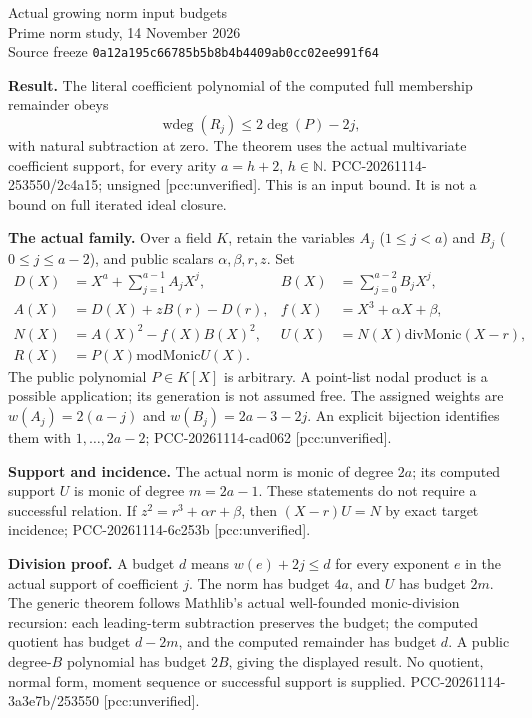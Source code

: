 \documentclass[10pt]{article}
\begin{document}
\begin{center}
{\Large Actual growing norm input budgets}\\[4pt]
Prime norm study, 14 November 2026\\
Source freeze \texttt{0a12a195c66785b5b8b4b4409ab0cc02ee991f64}
\end{center}

\textbf{Result.} The literal coefficient polynomial of the computed full
membership remainder obeys
\[
 \operatorname{wdeg}(R_j)\le 2\deg(P)-2j,
\]
with natural subtraction at zero. The theorem uses the actual multivariate
coefficient support, for every arity $a=h+2$, $h\in\mathbb N$.
PCC-20261114-253550/2c4a15; unsigned [pcc:unverified].
This is an input bound. It is not a bound on full iterated ideal closure.

\textbf{The actual family.} Over a field $K$, retain the variables $A_j$
($1\le j<a$) and $B_j$ ($0\le j\le a-2$), and public scalars
$\alpha,\beta,r,z$. Set
\begin{align*}
 D(X)&=X^a+\sum_{j=1}^{a-1}A_jX^j,&B(X)&=\sum_{j=0}^{a-2}B_jX^j,\\
 A(X)&=D(X)+zB(r)-D(r),&f(X)&=X^3+\alpha X+\beta,\\
 N(X)&=A(X)^2-f(X)B(X)^2,&U(X)&=N(X)\mathbin{\mathrm{divMonic}}(X-r),\\
 R(X)&=P(X)\mathbin{\mathrm{modMonic}}U(X).&&
\end{align*}
The public polynomial $P\in K[X]$ is arbitrary. A point-list nodal product
is a possible application; its generation is not assumed free.
The assigned weights are
$w(A_j)=2(a-j)$ and $w(B_j)=2a-3-2j$.
An explicit bijection identifies them with $1,\ldots,2a-2$;
PCC-20261114-cad062 [pcc:unverified].

\textbf{Support and incidence.} The actual norm is monic of degree $2a$;
its computed support $U$ is monic of degree $m=2a-1$.
These statements do not require a successful relation. If
$z^2=r^3+\alpha r+\beta$, then $(X-r)U=N$ by exact target incidence;
PCC-20261114-6c253b [pcc:unverified].

\textbf{Division proof.} A budget $d$ means
$w(e)+2j\le d$ for every exponent $e$ in the actual support of coefficient
$j$. The norm has budget $4a$, and $U$ has budget $2m$.
The generic theorem follows Mathlib's actual well-founded monic-division
recursion: each leading-term subtraction preserves the budget; the computed
quotient has budget $d-2m$, and the computed remainder has budget $d$.
A public degree-$B$ polynomial has budget $2B$, giving the displayed result.
No quotient, normal form, moment sequence or successful support is supplied.
PCC-20261114-3a3e7b/253550 [pcc:unverified].
\end{document}
